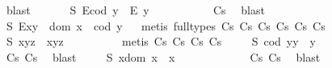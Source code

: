 \begin{isabellebody}
\ blast%
\endisatagproof
{\isafoldproof}%
%
\isadelimproof
%
\endisadelimproof
\ \isanewline
\ \ \ \isamarkupfalse%
\ S{}{\isacharcolon}\ {\isachardoublequoteopen}E{\isacharparenleft}cod\ y{\isacharparenright}\ \isactrlbold {\isasymrightarrow}\ E\ y{\isachardoublequoteclose}%
\isadelimproof
\ \ \ \ \ \ \ \ \ %
\endisadelimproof
%
\isatagproof
{}\isamarkupfalse%
\ Cs\ \isamarkupfalse%
\ blast%
\endisatagproof
{\isafoldproof}%
%
\isadelimproof
%
\endisadelimproof
\isanewline
\ \ \ \isamarkupfalse%
\ S{}{\isacharcolon}\ {\isachardoublequoteopen}E{\isacharparenleft}x{\isasymcdot}y{\isacharparenright}\ \isactrlbold {\isasymleftrightarrow}\ dom\ x\ {\isasymsimeq}\ cod\ y{\isachardoublequoteclose}%
\isadelimproof
\ %
\endisadelimproof
%
\isatagproof
{}\isamarkupfalse%
\ {\isacharparenleft}metis\ {\isacharparenleft}full{\isacharunderscore}types{\isacharparenright}\ Cs\ Cs\ Cs\ Cs\ Cs\ Cs{\isacharparenright}%
\endisatagproof
{\isafoldproof}%
%
\isadelimproof
%
\endisadelimproof
\isanewline
\ \ \ \isamarkupfalse%
\ S{}{\isacharcolon}\ {\isachardoublequoteopen}x{\isasymcdot}{\isacharparenleft}y{\isasymcdot}z{\isacharparenright}\ {\isasymcong}\ {\isacharparenleft}x{\isasymcdot}y{\isacharparenright}{\isasymcdot}z{\isachardoublequoteclose}%
\isadelimproof
\ \ \ \ \ \ \ \ %
\endisadelimproof
%
\isatagproof
{}\isamarkupfalse%
\ {\isacharparenleft}metis\ Cs\ Cs\ Cs\ Cs{\isacharparenright}%
\endisatagproof
{\isafoldproof}%
%
\isadelimproof
%
\endisadelimproof
\isanewline
\ \ \ \isamarkupfalse%
\ S{}{\isacharcolon}\ {\isachardoublequoteopen}{\isacharparenleft}cod\ y{\isacharparenright}{\isasymcdot}y\ {\isasymcong}\ y{\isachardoublequoteclose}%
\isadelimproof
\ \ \ \ \ \ \ \ \ \ \ %
\endisadelimproof
%
\isatagproof
{}\isamarkupfalse%
\ Cs\ Cs\ \isamarkupfalse%
\ blast%
\endisatagproof
{\isafoldproof}%
%
\isadelimproof
%
\endisadelimproof
\isanewline
\ \ \ \isamarkupfalse%
\ S{}{\isacharcolon}\ {\isachardoublequoteopen}x{\isasymcdot}{\isacharparenleft}dom\ x{\isacharparenright}\ {\isasymcong}\ x{\isachardoublequoteclose}%
\isadelimproof
\ \ \ \ \ \ \ \ \ \ \ %
\endisadelimproof
%
\isatagproof
{}\isamarkupfalse%
\ Cs\ Cs\ \isamarkupfalse%
\ blast%
\endisatagproof
{\isafoldproof}%
%
\isadelimproof
%
\endisadelimproof
\isanewline
\ \ \isamarkupfalse%
\isanewline
\isanewline
\isanewline
%
\isadelimtheory
%
\endisadelimtheory
%
\isatagtheory
%
\endisatagtheory
{\isafoldtheory}%
%
\isadelimtheory
%
\endisadelimtheory
%
\end{isabellebody}%
